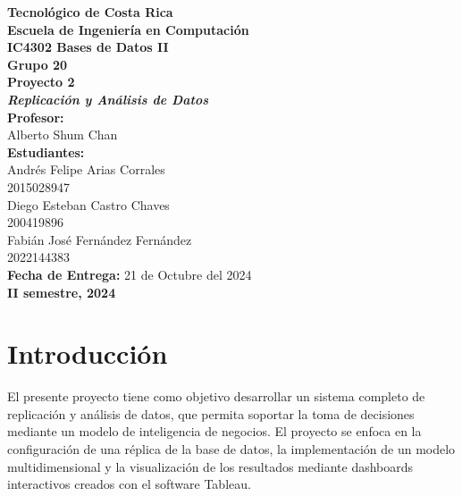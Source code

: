 \documentclass{article}
\begin{document}
\begin{titlepage}
    \centering
    {\Large\textbf{Tecnológico de Costa Rica}}\\[0.5cm]
    {\Large\textbf{Escuela de Ingeniería en Computación}}\\[0.5cm]
    {\Large\textbf{IC4302 Bases de Datos II}}\\[0.5cm]
    {\Large\textbf{Grupo 20}}\\[2cm]

    {\Large\bfseries Proyecto 2}\\[0.5cm]
    {\Large\bfseries \emph{Replicación y Análisis de Datos}}\\[2cm]

    \textbf{\large Profesor:}\\
    \large Alberto Shum Chan \\[1.5cm]

    \textbf{\large Estudiantes:}\\[0.5cm]
    \large Andrés Felipe Arias Corrales\\
    2015028947\\[0.5cm]
    \large Diego Esteban Castro Chaves\\
    200419896\\[0.5cm]
    \large Fabián José Fernández Fernández\\
    2022144383\\[2cm]

    \textbf{\large Fecha de Entrega:} 21 de Octubre del 2024\\[0.5cm]
    \textbf{\large II semestre, 2024}
\end{titlepage}

\setlength{\parskip}{\baselineskip}

\newpage  %
\tableofcontents  %
\newpage
\setlength{\parindent}{0pt}  %

\section{Introducción}

El presente proyecto tiene como objetivo desarrollar un sistema completo de replicación y análisis de datos,
que permita soportar la toma de decisiones mediante un modelo de inteligencia de negocios. El proyecto
se enfoca en la configuración de una réplica de la base de datos, la implementación de un modelo multidimensional y la visualización de los resultados mediante dashboards interactivos creados con el software Tableau.
\end{document}
